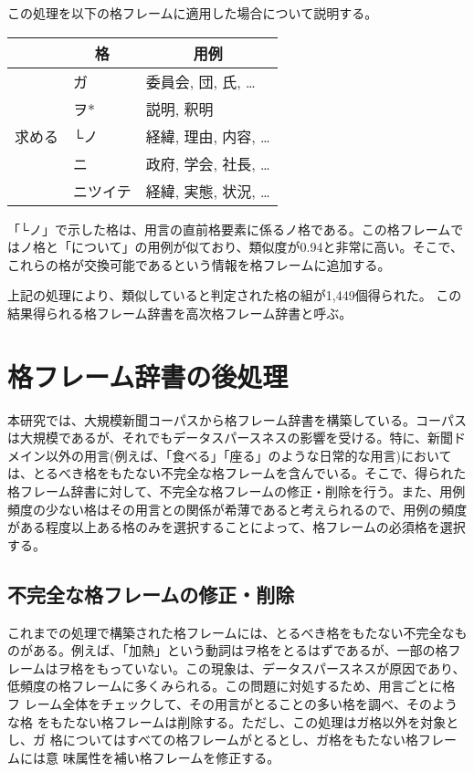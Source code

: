 \documentclass[fleqn]{nlp}
\newcommand{\sm}[1]{}
\begin{document}
この処理を以下の格フレームに適用した場合について説明する。
\begin{center}
 \begin{tabular}{l|l|l} \hline
                           & \multicolumn{1}{c|}{格} & \multicolumn{1}{c}{用例} \\ \hline
 \multirow{5}{3zw}{求める} & ガ  & 委員会, 団, 氏, …  \\
                           & ヲ* & 説明, 釈明 \\
                           & └ノ  & 経緯, 理由, 内容, … \\
                           & ニ  & 政府, 学会, 社長, … \\
                           & ニツイテ & 経緯, 実態, 状況, … \\ \hline
 \end{tabular}
\end{center}
「└ノ」で示した格は、用言の直前格要素に係るノ格である。この格フレームで
はノ格と「について」の用例が似ており、類似度が0.94と非常に高い。そこで、
これらの格が交換可能であるという情報を格フレームに追加する。

上記の処理により、類似していると判定された格の組が1,449個得られた。
この結果得られる格フレーム辞書を高次格フレーム辞書と呼ぶ。


\section{格フレーム辞書の後処理}

本研究では、大規模新聞コーパスから格フレーム辞書を構築している。コーパス
は大規模であるが、それでもデータスパースネスの影響を受ける。特に、新聞ド
メイン以外の用言(例えば、「食べる」「座る」のような日常的な用言)において
は、とるべき格をもたない不完全な格フレームを含んでいる。そこで、得られた
格フレーム辞書に対して、不完全な格フレームの修正・削除を行う。また、用例
頻度の少ない格はその用言との関係が希薄であると考えられるので、用例の頻度
がある程度以上ある格のみを選択することによって、格フレームの必須格を選択
する。


\subsection{不完全な格フレームの修正・削除}

これまでの処理で構築された格フレームには、とるべき格をもたない不完全なも
のがある。例えば、「加熱」という動詞はヲ格をとるはずであるが、一部の格フ
レームはヲ格をもっていない。この現象は、データスパースネスが原因であり、
低頻度の格フレームに多くみられる。この問題に対処するため、用言ごとに格フ
レーム全体をチェックして、その用言がとることの多い格を調べ、そのような格
をもたない格フレームは削除する。ただし、この処理はガ格以外を対象とし、ガ
格についてはすべての格フレームがとるとし、ガ格をもたない格フレームには意
味属性\sm{主体}を補い格フレームを修正する。
\end{document}
